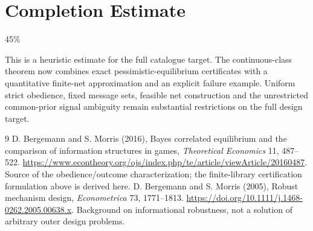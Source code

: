 \documentclass[11pt]{article}
\theoremstyle{definition}
\theoremstyle{remark}
\begin{document}
\section{Completion Estimate}
45\%

This is a heuristic estimate for the full catalogue target.
The continuous-class theorem now combines exact pessimistic-equilibrium certificates with a quantitative finite-net approximation and an explicit failure example. Uniform strict obedience, fixed message sets, feasible net construction and the unrestricted common-prior signal ambiguity remain substantial restrictions on the full design target.

\begin{thebibliography}{9}
 D. Bergemann and S. Morris (2016), Bayes correlated equilibrium and the comparison of information structures in games, \emph{Theoretical Economics} 11, 487--522. \url{https://www.econtheory.org/ojs/index.php/te/article/viewArticle/20160487}. Source of the obedience/outcome characterization; the finite-library certification formulation above is derived here.
 D. Bergemann and S. Morris (2005), Robust mechanism design, \emph{Econometrica} 73, 1771--1813. \url{https://doi.org/10.1111/j.1468-0262.2005.00638.x}. Background on informational robustness, not a solution of arbitrary outer design problems.
\end{thebibliography}
\end{document}
